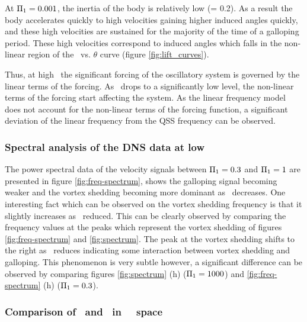  At $\Pi_1=0.001$, the inertia of the body is relatively low (\mstar= 0.2). As a result the body accelerates quickly to high velocities gaining higher induced angles quickly, and these high velocities are sustained for the majority of the time of a galloping period. These high velocities correspond to induced angles which falls in the non-linear  region of the \cy\ vs. $\theta$ curve (figure \ref{fig:lift_curves}). 

 Thus, at high \massstiff\, the significant forcing of the oscillatory system is governed by the linear terms of the forcing. As \massstiff\ drops to a significantly low level, the non-linear terms of the forcing start affecting the system. As the linear frequency model does not account for the non-linear terms of the forcing function, a significant deviation of the linear frequency from the QSS frequency can be observed.
\subsubsection{Spectral analysis of the DNS data at low \massstiff}



The power spectral data of the velocity signals between $\Pi_1=0.3$ and $\Pi_1=1$ are presented in figure \ref{fig:freq-spectrum}, shows the galloping signal becoming weaker and the vortex shedding becoming more dominant as \massstiff\ decreases. One interesting fact which can be observed on the vortex shedding frequency is that it slightly increases as \massstiff\ reduced. This can be clearly observed by comparing the frequency values at the peaks which represent the vortex shedding of figures \ref{fig:freq-spectrum} and \ref{fig:spectrum}. The peak at the vortex shedding shifts to the right as \massstiff\ reduces indicating some interaction between vortex shedding and galloping. This phenomenon is very subtle however, a significant difference can be observed by comparing figures \ref{fig:spectrum} (h) ($\Pi_1=1000$) and  \ref{fig:freq-spectrum} (h) ($\Pi_1=0.3$).


\subsubsection{Comparison of \freqlin\ and \freqqss\ in \massstiff\ \massdamp\ space}

